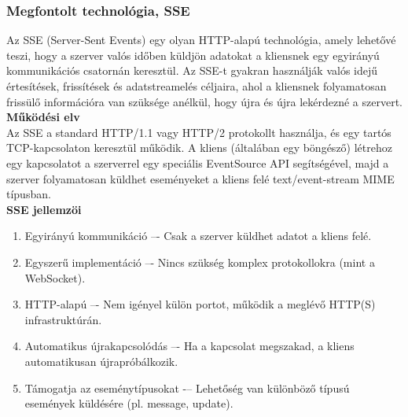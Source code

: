 \documentclass{thesis-ekf}
\theoremstyle{definition}
\theoremstyle{remark}
\begin{document}
	\subsubsection{Megfontolt technológia, SSE}
	\label{sssec_SSE}
	Az SSE (Server-Sent Events) egy olyan HTTP-alapú technológia, amely lehetővé teszi, hogy a szerver valós időben küldjön adatokat a kliensnek egy egyirányú kommunikációs csatornán keresztül. Az SSE-t gyakran használják valós idejű értesítések, frissítések és adatstreamelés céljaira, ahol a kliensnek folyamatosan frissülő információra van szüksége anélkül, hogy újra és újra lekérdezné a szervert\cite{bib_SSE_spec,bib_SSE}.\\
	\textbf{Működési elv}\\
	Az SSE a standard HTTP/1.1 vagy HTTP/2 protokollt használja, és egy tartós TCP-kapcsolaton keresztül működik. A kliens (általában egy böngésző) létrehoz egy kapcsolatot a szerverrel egy speciális EventSource API segítségével, majd a szerver folyamatosan küldhet eseményeket a kliens felé text/event-stream MIME típusban.\\
	\textbf{SSE jellemzöi}\\
	\begin{enumerate}
		\item Egyirányú kommunikáció –- Csak a szerver küldhet adatot a kliens felé.
		\item Egyszerű implementáció –- Nincs szükség komplex protokollokra (mint a WebSocket).
		\item HTTP-alapú –- Nem igényel külön portot, működik a meglévő HTTP(S) infrastruktúrán.
		\item Automatikus újrakapcsolódás –- Ha a kapcsolat megszakad, a kliens automatikusan újrapróbálkozik.
		\item Támogatja az eseménytípusokat -– Lehetőség van különböző típusú események küldésére (pl. message, update).
	\end{enumerate}
	
\end{document}
